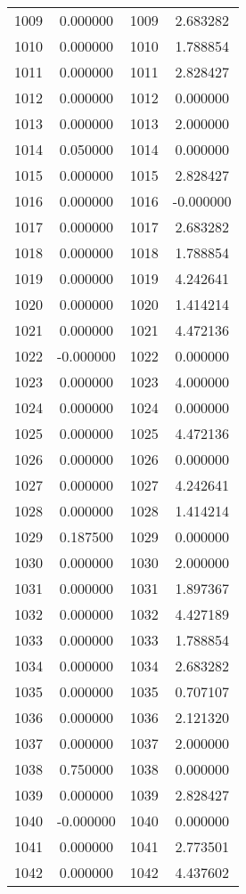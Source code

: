\documentclass[12pt]{article}
\begin{document}
\begin{longtable}{@{}cccc@{}}
1009 & 0.000000 & 1009 & 2.683282 \\
1010 & 0.000000 & 1010 & 1.788854 \\
1011 & 0.000000 & 1011 & 2.828427 \\
1012 & 0.000000 & 1012 & 0.000000 \\
1013 & 0.000000 & 1013 & 2.000000 \\
1014 & 0.050000 & 1014 & 0.000000 \\
1015 & 0.000000 & 1015 & 2.828427 \\
1016 & 0.000000 & 1016 & -0.000000 \\
1017 & 0.000000 & 1017 & 2.683282 \\
1018 & 0.000000 & 1018 & 1.788854 \\
1019 & 0.000000 & 1019 & 4.242641 \\
1020 & 0.000000 & 1020 & 1.414214 \\
1021 & 0.000000 & 1021 & 4.472136 \\
1022 & -0.000000 & 1022 & 0.000000 \\
1023 & 0.000000 & 1023 & 4.000000 \\
1024 & 0.000000 & 1024 & 0.000000 \\
1025 & 0.000000 & 1025 & 4.472136 \\
1026 & 0.000000 & 1026 & 0.000000 \\
1027 & 0.000000 & 1027 & 4.242641 \\
1028 & 0.000000 & 1028 & 1.414214 \\
1029 & 0.187500 & 1029 & 0.000000 \\
1030 & 0.000000 & 1030 & 2.000000 \\
1031 & 0.000000 & 1031 & 1.897367 \\
1032 & 0.000000 & 1032 & 4.427189 \\
1033 & 0.000000 & 1033 & 1.788854 \\
1034 & 0.000000 & 1034 & 2.683282 \\
1035 & 0.000000 & 1035 & 0.707107 \\
1036 & 0.000000 & 1036 & 2.121320 \\
1037 & 0.000000 & 1037 & 2.000000 \\
1038 & 0.750000 & 1038 & 0.000000 \\
1039 & 0.000000 & 1039 & 2.828427 \\
1040 & -0.000000 & 1040 & 0.000000 \\
1041 & 0.000000 & 1041 & 2.773501 \\
1042 & 0.000000 & 1042 & 4.437602 \\

\end{longtable}
\end{document}
